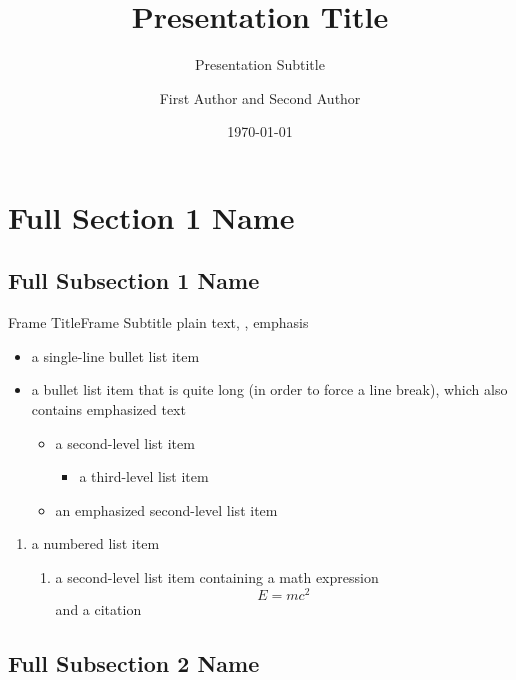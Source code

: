 \documentclass[
  aspectratio=169,
]{beamer}
\title[Short Title]{Presentation Title}
\subtitle[Short Subtitle]{Presentation Subtitle}
\author[A. Author, B. Author]{First Author and Second Author}
\institute[Inst.]{Institution Name -- Department}
\date{\today}
\begin{document}
\begin{frame}[plain]
\maketitle
\end{frame}

\section[Short Section 1 Name]{Full Section 1 Name}
\subsection[Short Subsection 1 Name]{Full Subsection 1 Name}

\begin{frame}{Frame Title}{Frame Subtitle}
plain text, , \alert{emphasis}
\begin{itemize}
  \item a single-line bullet list item
  \item a bullet list item that is quite long (in order to force a line break),
    which also contains \alert{emphasized text}
  \begin{itemize}
    \item a second-level list item
    \begin{itemize}
      \item a third-level list item
    \end{itemize}
    \item \alert{an emphasized second-level list item}
  \end{itemize}
\end{itemize}
\begin{enumerate}
  \item a numbered list item
  \begin{enumerate}
    \item a second-level list item containing a math expression
      \[ E = mc^2 \]
      and a citation \cite{einstein1905tragheit}
  \end{enumerate}
\end{enumerate}
\end{frame}

\subsection[Short Subsection 2 Name]{Full Subsection 2 Name}
\end{document}
